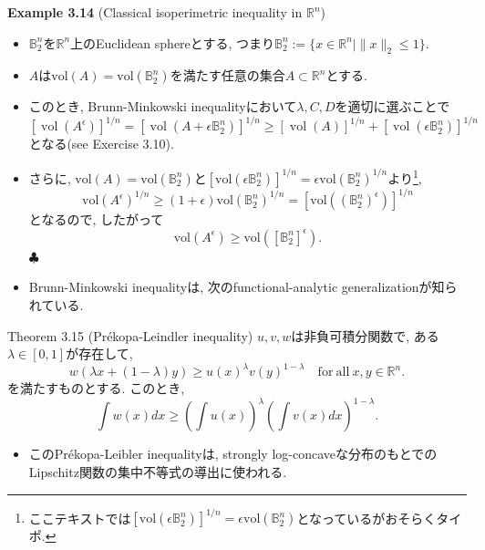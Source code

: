 \documentclass[aspectratio=169, dvipdfmx]{beamer}
\def\endexample{\hfill $\clubsuit$}
\begin{document}
\begin{frame}{}{}
{\bf Example 3.14} (Classical isoperimetric inequality in $\mathbb{R}^n$)
\begin{itemize}
    \item $\mathbb{B}_2^n$を$\mathbb{R}^n$上のEuclidean sphereとする,
    つまり$\mathbb{B}_2^n:=\{x\in\mathbb{R}^n\mid \|x\|_2\le 1\}$.
    \item $A$は$\mathrm{vol}(A) = \mathrm{vol}(\mathbb{B}_2^n)$を満たす任意の集合$A\subset \mathbb{R}^n$とする.
    \item このとき, Brunn-Minkowski inequalityにおいて$\lambda, C, D$を適切に選ぶことで
    \[
        \left[\operatorname{vol}\left(A^{\epsilon}\right)\right]^{1 / n}
        =\left[\operatorname{vol}\left(A+\epsilon \mathbb{B}_{2}^{n}\right)\right]^{1 / n}
        \geq[\operatorname{vol}(A)]^{1 / n}+\left[\operatorname{vol}\left(\epsilon \mathbb{B}_{2}^{n}\right)\right]^{1 / n}
    \]
    となる(see Exercise 3.10).
    \item さらに, $\mathrm{vol}(A) = \mathrm{vol}(\mathbb{B}_2^n)$と$[\mathrm{vol}(\epsilon\mathbb{B}_2^n)]^{1/n} = \epsilon\mathrm{vol}(\mathbb{B}_2^n)^{1/n}$より\footnote{ここテキストでは$[\mathrm{vol}(\epsilon\mathbb{B}_2^n)]^{1/n} = \epsilon\mathrm{vol}(\mathbb{B}_2^n)$となっているがおそらくタイポ.},
    \[ 
        \mathrm{vol}(A^\epsilon)^{1/n}
        \ge (1+\epsilon) \mathrm{vol}(\mathbb{B}_2^n)^{1/n}
        = [\mathrm{vol}((\mathbb{B}_2^n)^\epsilon)]^{1/n}
    \]
    となるので, したがって
    \[
        \mathrm{vol}(A^\epsilon) \ge \mathrm{vol}([\mathbb{B}_2^n]^\epsilon).
        \tag{3.44}\label{3.44}
    \]
    \endexample
\end{itemize}
\end{frame}

\begin{frame}
    \begin{itemize}
        \item Brunn-Minkowski inequalityは, 次のfunctional-analytic generalizationが知られている.
    \end{itemize}
    \begin{block}{Theorem 3.15 (Pr\'ekopa-Leindler inequality)}
        $u,v,w$は非負可積分関数で, ある$\lambda \in [0, 1]$が存在して,
        \[ w(\lambda x + (1-\lambda)y) \ge u(x)^\lambda v(y)^{1-\lambda}
        \quad \mathrm{for\ all}\ x,y\in\mathbb{R}^n.
        \tag{3.46}\label{3.46}\]
        を満たすものとする. このとき,
        \[
            \int w(x)dx \ge \left(\int u(x)\right)^\lambda \left(\int v(x)dx\right)^{1-\lambda}.
            \tag{3.47}\label{3.47}
        \]
    \end{block}
    \begin{itemize}
        \item このPr\'ekopa-Leibler inequalityは,
        strongly log-concaveな分布のもとでのLipschitz関数の集中不等式の導出に使われる.
    \end{itemize}
\end{frame}
\end{document}
